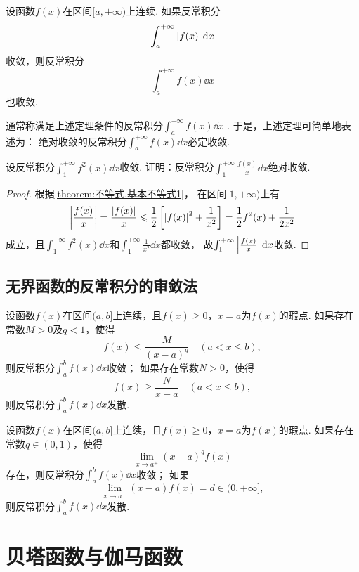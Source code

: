 \begin{theorem}\label{theorem:定积分.绝对收敛的无穷限反常积分必收敛}
设函数\(f(x)\)在区间\([a,+\infty)\)上连续.
如果反常积分\[
\int_a^{+\infty} \abs{f(x)} \dd{x}
\]收敛，则反常积分\[
\int_a^{+\infty} f(x) \dd{x}
\]也收敛.
\end{theorem}
通常称满足上述定理条件的反常积分\(\int_a^{+\infty} f(x) \dd{x}\) .
于是，上述定理可简单地表述为：
绝对收敛的反常积分\(\int_a^{+\infty} f(x) \dd{x}\)必定收敛.

\begin{example}
设反常积分\(\int_1^{+\infty} f^2(x) \dd{x}\)收敛.
证明：反常积分\(\int_1^{+\infty} \frac{f(x)}{x} \dd{x}\)绝对收敛.
\begin{proof}
根据\cref{theorem:不等式.基本不等式1}，%
在区间\([1,+\infty)\)上有\[
\abs{\frac{f(x)}{x}}
= \frac{\abs{f(x)}}{x}
\leqslant \frac{1}{2} \left[
	\abs{f(x)}^2 + \frac{1}{x^2}
\right]
= \frac{1}{2} f^2(x) + \frac{1}{2x^2}
\]成立，且\(\int_1^{+\infty} f^2(x) \dd{x}\)和\(\int_1^{+\infty} \frac{1}{x^2} \dd{x}\)都收敛，%
故\(\int_1^{+\infty} \abs{\frac{f(x)}{x}} \dd{x}\)收敛.
\end{proof}
\end{example}

\subsection{无界函数的反常积分的审敛法}
\begin{theorem}[比较审敛法]\label{theorem:定积分.无界函数的反常积分的比较审敛法}
设函数\(f(x)\)在区间\((a,b]\)上连续，且\(f(x) \geqslant 0\)，\(x=a\)为\(f(x)\)的瑕点.
如果存在常数\(M > 0\)及\(q < 1\)，使得\[
f(x) \leqslant \frac{M}{(x-a)^q} \quad (a < x \leqslant b),
\]则反常积分\(\int_a^b f(x) \dd{x}\)收敛；
如果存在常数\(N > 0\)，使得\[
f(x) \geqslant \frac{N}{x - a} \quad (a < x \leqslant b),
\]则反常积分\(\int_a^b f(x) \dd{x}\)发散.
\end{theorem}

\begin{theorem}[极限审敛法]\label{theorem:定积分.无界函数的反常积分的极限审敛法}
设函数\(f(x)\)在区间\((a,b]\)上连续，且\(f(x) \geqslant 0\)，\(x=a\)为\(f(x)\)的瑕点.
如果存在常数\(q \in (0,1)\)，使得\[
\lim\limits_{x \to a^+} (x-a)^q f(x)
\]存在，则反常积分\(\int_a^b f(x) \dd{x}\)收敛；
如果\[
\lim\limits_{x \to a^+} (x-a) f(x) = d \in (0,+\infty],
\]则反常积分\(\int_a^b f(x) \dd{x}\)发散.
\end{theorem}

\section{贝塔函数与伽马函数}
